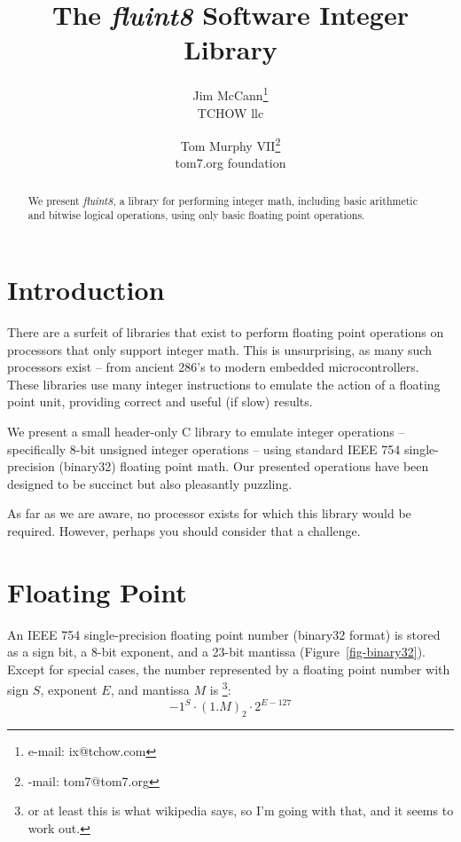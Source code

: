 \documentclass{acmsiggraph}
\title{The {\em fluint8} Software Integer Library}
\author{Jim McCann\thanks{e-mail: ix@tchow.com}\\
  TCHOW llc
  \and
  Tom Murphy VII\thanks{\protect \rotatebox[origin=c]{180}{e}-mail: tom7@tom7.org}\\
  tom7.org foundation}
\theoremstyle{remark}
\theoremstyle{definition}
\begin{document}
\maketitle

\begin{abstract}
We present {\em fluint8}, a library for performing integer math, including basic arithmetic and bitwise logical operations, using only basic floating point operations.
\end{abstract}
\setcounter{footnote}{2}

\begin{CRcatlist}
\end{CRcatlist}

\section{Introduction}
There are a surfeit of libraries that exist to perform floating point operations on processors that only support integer math.
This is unsurprising, as many such processors exist -- from ancient 286's to modern embedded microcontrollers.
These libraries use many integer instructions to emulate the action of a floating point unit, providing correct and useful (if slow) results.

We present a small header-only C library to emulate integer operations -- specifically 8-bit unsigned integer operations -- using standard IEEE 754 single-precision (binary32) floating point math.
Our presented operations have been designed to be succinct but also pleasantly puzzling.

As far as we are aware, no processor exists for which this library would be required.
However, perhaps you should consider that a challenge.

\section{Floating Point}
An IEEE 754 single-precision floating point number (binary32 format) is stored as a sign bit, a 8-bit exponent, and a 23-bit mantissa (Figure~\ref{fig-binary32}).
Except for special cases, the number represented by a floating point number with sign $S$, exponent $E$, and mantissa $M$ is
\footnote{or at least this is what wikipedia says, so I'm going with that, and it seems to work out.}:
\begin{displaymath}
-1^{S}\cdot (1.M)_2 \cdot 2^{E-127}
\end{displaymath}
\end{document}

